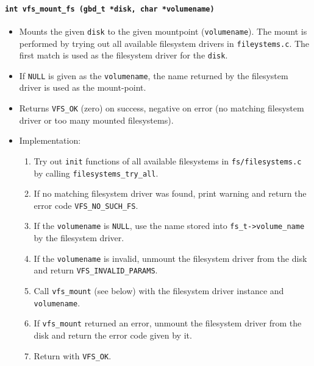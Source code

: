 \documentclass[twoside,a4paper]{report}
\makeatletter
\newenvironment{function}[3]{%
\paragraph{\texttt{#1 {\textbf{#2}} (#3)}}%
\index{#2@\texttt{#2}}%
\begin{itemize}%
}{%
\end{itemize}%
}
\makeatother
\begin{document}
\begin{function}{int}{vfs\_mount\_fs}{gbd\_t *disk, char *volumename}

\item Mounts the given \texttt{disk} to the given mountpoint
(\texttt{volumename}). The mount is performed by trying out all
available filesystem drivers in \texttt{fileystems.c}. The first match
is used as the filesystem driver for the \texttt{disk}.

\item If \texttt{NULL} is given as the \texttt{volumename}, the name
returned by the filesystem driver is used as the mount-point.

\item Returns \texttt{VFS\_OK} (zero) on success, negative on error
(no matching filesystem driver or too many mounted filesystems).

\item Implementation:
\begin{enumerate}

\item Try out \texttt{init} functions of all available filesystems in
\texttt{fs/filesystems.c} by calling \texttt{filesystems\_try\_all}.

\item If no matching filesystem driver was found, print warning and
return the error code \texttt{VFS\_NO\_SUCH\_FS}.

\item If the \texttt{volumename} is \texttt{NULL}, use the name stored
into \texttt{fs\_t->volume\_name} by the filesystem driver.

\item If the \texttt{volumename} is invalid, unmount the filesystem driver
from the disk and return \texttt{VFS\_INVALID\_PARAMS}.

\item Call \texttt{vfs\_mount} (see below) with the filesystem driver
instance and \texttt{volumename}.

\item If \texttt{vfs\_mount} returned an error, unmount the filesystem
driver from the disk and return the error code given by it.

\item Return with \texttt{VFS\_OK}.

\end{enumerate}
\end{function}
\end{document}
